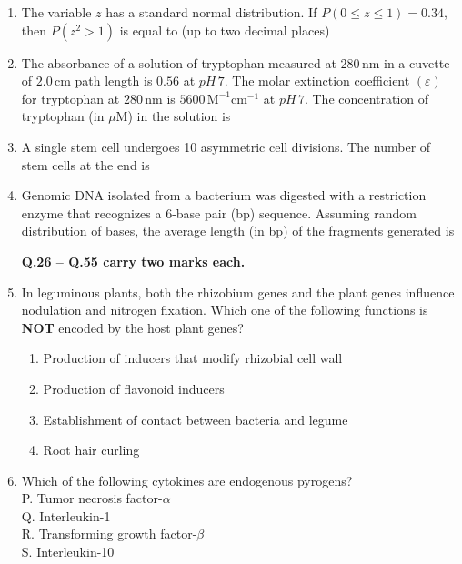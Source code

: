 \documentclass[journal,12pt,onecolumn]{IEEEtran}
\theoremstyle{remark}
\begin{document}
\begin{enumerate}
    \item The variable $z$ has a standard normal distribution. If $P(0 \leq z \leq 1) = 0.34$, then $P(z^2 > 1)$ is equal to (up to two decimal places) \underline{\hspace{2cm}}
    
    \item The absorbance of a solution of tryptophan measured at $280\,\mathrm{nm}$ in a cuvette of $2.0\,\mathrm{cm}$ path length is $0.56$ at $pH\,7$. The molar extinction coefficient $(\varepsilon)$ for tryptophan at $280\,\mathrm{nm}$ is $5600\,\mathrm{M}^{-1}\mathrm{cm}^{-1}$ at $pH\,7$. The concentration of tryptophan (in $\mu$M) in the solution is \underline{\hspace{2cm}}
    
    \item A single stem cell undergoes 10 asymmetric cell divisions. The number of stem cells at the end is \underline{\hspace{2cm}}
    
    \item Genomic DNA isolated from a bacterium was digested with a restriction enzyme that recognizes a $6$-base pair (bp) sequence. Assuming random distribution of bases, the average length (in bp) of the fragments generated is \underline{\hspace{2cm}}

{\textbf{Q.26 -- Q.55 carry two marks each.}}


    \item In leguminous plants, both the rhizobium genes and the plant genes influence nodulation and nitrogen fixation. Which one of the following functions is \textbf{NOT} encoded by the host plant genes?
    
    \begin{enumerate}
        \item Production of inducers that modify rhizobial cell wall
        \item Production of flavonoid inducers
        \item Establishment of contact between bacteria and legume
        \item Root hair curling
    \end{enumerate}
    

    \item Which of the following cytokines are endogenous pyrogens?\\
    P. Tumor necrosis factor-$\alpha$\\
    Q. Interleukin-1\\
    R. Transforming growth factor-$\beta$\\
    S. Interleukin-10
    

\end{enumerate}
\end{document}
